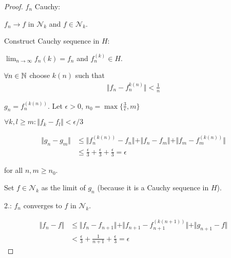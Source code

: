 \begin{proof}
$f_n$ Cauchy:

$f_n\to f$ in $\mathcal{N}_k$ and $f\in\mathcal{N}_k$.

Construct Cauchy sequence in $H$:

$\lim_{n\to\infty}f_n{(k)}=f_n$ and $f_n^{(k)}\in H$.

$\forall n\in\mathbb{N}$ choose $k(n)$ such that 
\begin{align*}
    \Vert f_n-f_n^{k(n)}\Vert<\frac{1}{n}
\end{align*}

$g_n=f_n^{(k(n))}$. Let $\epsilon>0$, $n_0=\max\{\frac{3}{\epsilon},m\}$

$\forall k,l\geq m:\Vert f_k-f_l\Vert<\epsilon/3$

\begin{align*}
    \Vert g_n-g_m\Vert &\leq \Vert f_n^{(k(n))}-f_n\Vert +\Vert f_n-f_m\Vert+\Vert f_m-f_m^{(k(n))}\Vert\\
    &\leq \frac{\epsilon}{3}+\frac{\epsilon}{3}+\frac{\epsilon}{3}=\epsilon
\end{align*}

for all $n,m\geq n_0$.

Set $f\in\mathcal{N}_k$ as the limit of $g_n$ (because it is a Cauchy sequence in $H$).

2.: $f_n$ converges to $f$ in $\mathcal{N}_k$.


\begin{align*}
    \Vert f_n-f\Vert&\leq \Vert f_n-f_{n+1}\Vert + \Vert f_{n+1}-f_{n+1}^{(k(n+1))}\Vert + \Vert g_{n+1}-f\Vert\\
    &<\frac{\epsilon}{3}+\frac{1}{n+1}+\frac{\epsilon}{3}=\epsilon
\end{align*}
\end{proof}




